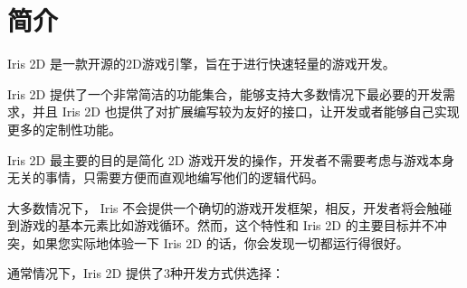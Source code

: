\hypertarget{index_intro_sec}{}\section{简介}\label{index_intro_sec}
Iris 2D 是一款开源的2\+D游戏引擎，旨在于进行快速轻量的游戏开发。

Iris 2D 提供了一个非常简洁的功能集合，能够支持大多数情况下最必要的开发需求，并且 Iris 2D 也提供了对扩展编写较为友好的接口，让开发或者能够自己实现更多的定制性功能。

Iris 2D 最主要的目的是简化 2D 游戏开发的操作，开发者不需要考虑与游戏本身无关的事情，只需要方便而直观地编写他们的逻辑代码。

大多数情况下， Iris 不会提供一个确切的游戏开发框架，相反，开发者将会触碰到游戏的基本元素比如游戏循环。然而，这个特性和 Iris 2D 的主要目标并不冲突，如果您实际地体验一下 Iris 2D 的话，你会发现一切都运行得很好。

通常情况下，\+Iris 2D 提供了3种开发方式供选择：

